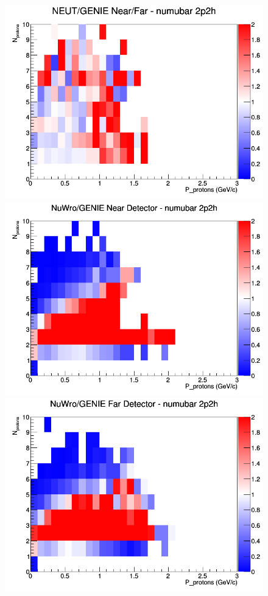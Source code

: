 \begin{figure}[h]
\endminipage
{}
\includegraphics[width=\linewidth]{N_P/nominal/protons/ratios/2p2h_NEUT_GENIE_numubar_NF_N_P.png}
\endminipage
\newline
{}
\includegraphics[width=\linewidth]{N_P/nominal/protons/ratios/2p2h_NuWro_GENIE_numubar_near_N_P.png}
\endminipage
{}
\includegraphics[width=\linewidth]{N_P/nominal/protons/ratios/2p2h_NuWro_GENIE_numubar_far_N_P.png}

\end{figure}
